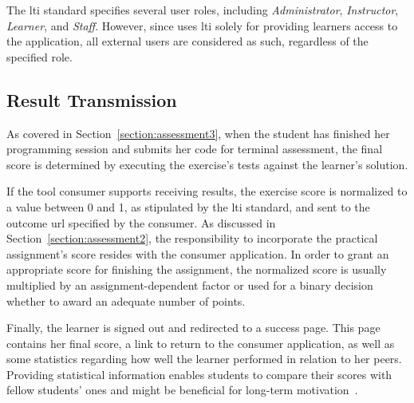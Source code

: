 The \gls{lti} standard specifies several user roles, including \emph{Administrator}, \emph{Instructor}, \emph{Learner}, and \emph{Staff}. However, since \tool uses \gls{lti} solely for providing learners access to the application, all external users are considered as such, regardless of the specified role.

\subsection{Result Transmission}

As covered in Section~\ref{section:assessment3}, when the student has finished her programming session and submits her code for terminal assessment, the final score is determined by executing the exercise's tests against the learner's solution.

If the tool consumer supports receiving results, the exercise score is normalized to a value between 0 and 1, as stipulated by the \gls{lti} standard, and sent to the outcome \gls{url} specified by the consumer. As discussed in Section~\ref{section:assessment2}, the responsibility to incorporate the practical assignment's score resides with the consumer application. In order to grant an appropriate score for finishing the assignment, the normalized score is usually multiplied by an assignment-dependent factor or used for a binary decision whether to award an adequate number of points.

Finally, the learner is signed out and redirected to a success page. This page contains her final score, a link to return to the consumer application, as well as some statistics regarding how well the learner performed in relation to her peers. Providing statistical information enables students to compare their scores with fellow students' ones and might be beneficial for long-term motivation~\cite{pieterse2013automated}.
